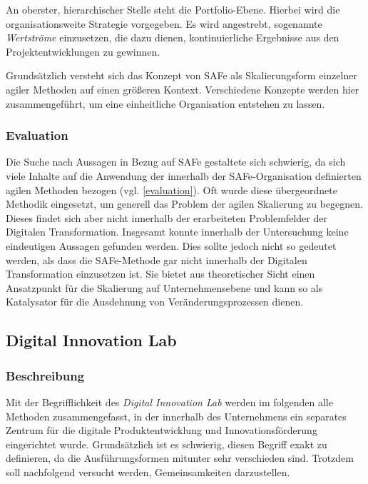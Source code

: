 An oberster, hierarchischer Stelle  steht  die Portfolio-Ebene. Hierbei wird die organisationsweite Strategie vorgegeben. Es wird angestrebt, sogenannte \textit{Wertströme} einzusetzen, die dazu dienen, kontinuierliche  Ergebnisse aus den Projektentwicklungen zu gewinnen.

Grundsätzlich versteht sich das Konzept von SAFe als Skalierungsform einzelner agiler Methoden auf einen größeren Kontext. Verschiedene Konzepte werden hier zusammengeführt, um eine einheitliche Organisation entstehen zu lassen.

\subsubsection{Evaluation}

Die Suche nach Aussagen in Bezug auf SAFe gestaltete sich schwierig, da sich viele Inhalte auf die Anwendung der innerhalb der SAFe-Organisation definierten agilen Methoden bezogen (vgl. \ref{evaluation}). Oft wurde diese übergeordnete Methodik eingesetzt, um generell das Problem der agilen Skalierung zu begegnen. Dieses findet sich aber nicht innerhalb der erarbeiteten Problemfelder der Digitalen Transformation. Insgesamt konnte innerhalb der Untersuchung keine eindeutigen Aussagen gefunden werden. Dies sollte jedoch nicht so gedeutet werden, als dass die SAFe-Methode gar nicht innerhalb der Digitalen Transformation  einzusetzen ist. Sie bietet aus theoretischer Sicht einen Ansatzpunkt für die Skalierung auf Unternehmensebene und kann so als Katalysator für die Ausdehnung von Veränderungsprozessen dienen.

\subsection{Digital Innovation Lab}

\subsubsection{Beschreibung}

Mit der Begrifflichkeit des \textit{Digital Innovation Lab} werden im folgenden alle Methoden zusammengefasst, in der innerhalb des Unternehmens ein separates Zentrum für die digitale Produktentwicklung und Innovationsförderung eingerichtet wurde. Grundsätzlich ist es schwierig, diesen Begriff exakt zu definieren, da die Ausführungsformen mitunter sehr verschieden sind. Trotzdem soll nachfolgend versucht werden, Gemeinsamkeiten darzustellen.

